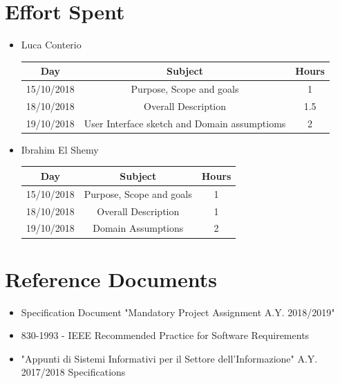 \documentclass[12pt,a4paper]{article}
\begin{document}
	\section{Effort Spent}
		\begin{itemize}
			\item Luca Conterio
			\begin{center}
				\begin{tabular}{| c | c | c |}
					\hline
					Day & Subject & Hours \\ \hline
					15/10/2018 & Purpose, Scope and goals & 1 \\
					18/10/2018 & Overall Description & 1.5 \\
          19/10/2018  & User Interface sketch and Domain assumptioms & 2 \\
					\hline
				\end{tabular}
			\end{center}
		
			\item Ibrahim El Shemy
			\begin{center}
				\begin{tabular}{| c | c | c |}
					\hline
					Day & Subject & Hours \\ \hline
					15/10/2018 & Purpose, Scope and goals & 1 \\
					18/10/2018 & Overall Description & 1 \\
          19/10/2018  & Domain Assumptions & 2 \\
					\hline
				\end{tabular}
			\end{center}
		\end{itemize}
	\section{Reference Documents}
	\begin{itemize}
		\item Specification Document "Mandatory Project Assignment A.Y. 2018/2019"
		\item 830-1993 - IEEE Recommended Practice for Software Requirements
		\item "Appunti di Sistemi Informativi per il Settore dell'Informazione" A.Y. 2017/2018
		 Specifications
	\end{itemize}
	
\end{document}

